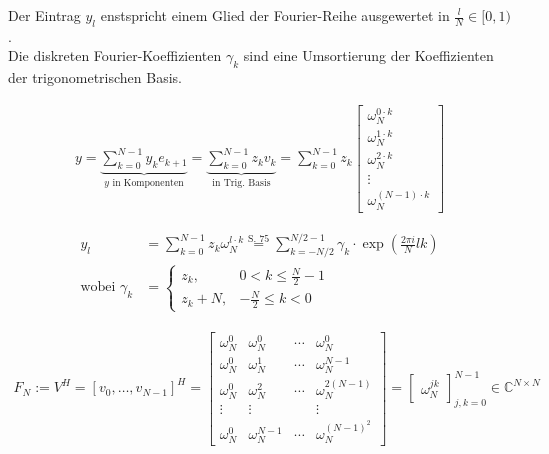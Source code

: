 Der Eintrag $y_l$ enstspricht einem Glied der Fourier-Reihe ausgewertet in $\frac{l}{N} \in [0,1)$. \\
Die diskreten Fourier-Koeffizienten $\gamma_k$ sind eine Umsortierung der Koeffizienten der trigonometrischen Basis.
\begin{multicols}{2}
    \begin{align*}
        y = \underbrace{\sum_{k=0}^{N-1} y_k e_{k+1}}_{y \text{ in Komponenten}} = \underbrace{\sum_{k=0}^{N-1} z_k v_k}_{\text{in Trig. Basis}} = \sum_{k=0}^{N-1} z_k
        \begin{bmatrix}
            \omega_N^{0 \cdot k} \\ \omega_N^{1 \cdot k} \\ \omega_N^{2 \cdot k} \\ \vdots \\ \omega_N^{(N-1) \cdot k}
        \end{bmatrix}
    \end{align*}
    \newcolumn

    \begin{align*}
        y_l                   & = \sum_{k=0}^{N-1} z_k \omega_N^{l \cdot k} \overset{\text{S. 75}}{=} \sum_{k=-N/2}^{N/2-1} \gamma_k \cdot \exp(\frac{2\pi i}{N}lk) \\
        \text{wobei }\gamma_k & =
        \begin{cases}
            z_k,   & 0 < k \leq \frac{N}{2}-1 \\
            z_k+N, & -\frac{N}{2} \leq k < 0
        \end{cases}
    \end{align*}
\end{multicols}

\begin{align*}
    F_N := V^H = [v_0, \ldots, v_{N-1}]^H =
    \begin{bmatrix}
        \omega_N^0 & \omega_N^0     & \cdots & \omega_N^0         \\
        \omega_N^0 & \omega_N^1     & \cdots & \omega_N^{N-1}     \\
        \omega_N^0 & \omega_N^2     & \cdots & \omega_N^{2(N-1)}  \\
        \vdots     & \vdots         &        & \vdots             \\
        \omega_N^0 & \omega_N^{N-1} & \cdots & \omega_N^{(N-1)^2}
    \end{bmatrix}
    =
    \begin{bmatrix}
        \omega_N^{jk}
    \end{bmatrix}^{N-1}_{j,k = 0}
    \in \mathbb{C}^{N\times N}
\end{align*}

